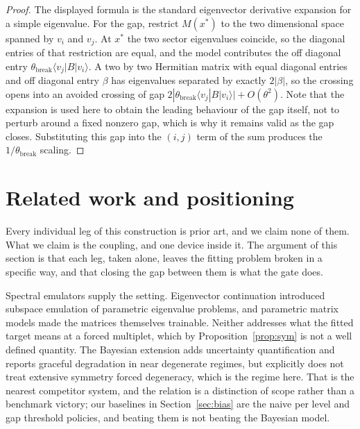 \documentclass[10pt,a4paper]{amsart}
\begin{document}
\begin{proof}
The displayed formula is the standard eigenvector derivative expansion for a
simple eigenvalue. For the gap, restrict $M(x^\ast)$ to the two dimensional
space spanned by $v_i$ and $v_j$. At $x^\ast$ the two sector eigenvalues
coincide, so the diagonal entries of that restriction are equal, and the model
contributes the off diagonal entry $\theta_{\mathrm{break}}\langle
v_j|B|v_i\rangle$. A two by two Hermitian matrix with equal diagonal entries and
off diagonal entry $\beta$ has eigenvalues separated by exactly $2|\beta|$, so
the crossing opens into an avoided crossing of gap
$2|\theta_{\mathrm{break}}\langle v_j|B|v_i\rangle|+O(\theta^2)$. Note that the
expansion is used here to obtain the leading behaviour of the gap itself, not to
perturb around a fixed nonzero gap, which is why it remains valid as the gap
closes. Substituting this gap into the $(i,j)$ term of the sum produces the
$1/\theta_{\mathrm{break}}$ scaling.
\end{proof}


\section{Related work and positioning}\label{sec:related}
Every individual leg of this construction is prior art, and we claim none of
them. What we claim is the coupling, and one device inside it. The argument of
this section is that each leg, taken alone, leaves the fitting problem broken in
a specific way, and that closing the gap between them is what the gate does.

Spectral emulators supply the setting. Eigenvector continuation \cite{Frame2018}
introduced subspace emulation of parametric eigenvalue problems, and parametric
matrix models \cite{Cook2025} made the matrices themselves trainable. Neither
addresses what the fitted target means at a forced multiplet, which by
Proposition~\ref{prop:sym} is not a well defined quantity. The Bayesian
extension \cite{BPMM2025} adds uncertainty quantification and reports graceful
degradation in near degenerate regimes, but explicitly does not treat extensive
symmetry forced degeneracy, which is the regime here. That is the nearest
competitor system, and the relation is a distinction of scope rather than a
benchmark victory; our baselines in Section~\ref{sec:bias} are the naive per
level and gap threshold policies, and beating them is not beating the Bayesian
model.
\end{document}
